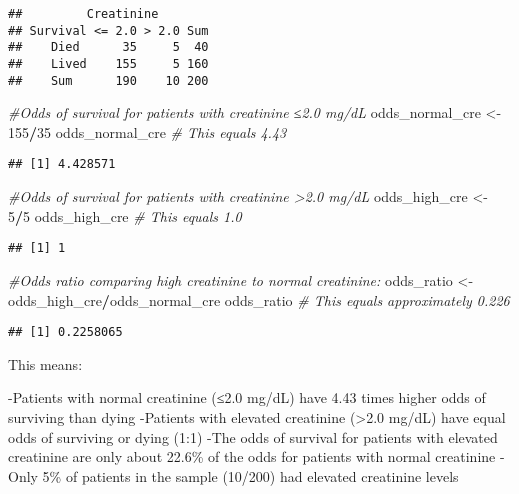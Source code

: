 \documentclass[
]{article}
\newenvironment{Shaded}{\begin{snugshade}}{\end{snugshade}}
\newcommand{\CommentTok}[1]{\textcolor[rgb]{0.56,0.35,0.01}{\textit{#1}}}
\newcommand{\DecValTok}[1]{\textcolor[rgb]{0.00,0.00,0.81}{#1}}
\newcommand{\NormalTok}[1]{#1}
\newcommand{\OtherTok}[1]{\textcolor[rgb]{0.56,0.35,0.01}{#1}}
\newcommand{\SpecialCharTok}[1]{\textcolor[rgb]{0.81,0.36,0.00}{\textbf{#1}}}
\begin{document}
\begin{verbatim}
##         Creatinine
## Survival <= 2.0 > 2.0 Sum
##    Died      35     5  40
##    Lived    155     5 160
##    Sum      190    10 200
\end{verbatim}

\begin{Shaded}
\begin{Highlighting}[]
\CommentTok{\#Odds of survival for patients with creatinine ≤2.0 mg/dL}
\NormalTok{odds\_normal\_cre }\OtherTok{\textless{}{-}} \DecValTok{155}\SpecialCharTok{/}\DecValTok{35}
\NormalTok{odds\_normal\_cre  }\CommentTok{\# This equals 4.43}
\end{Highlighting}
\end{Shaded}

\begin{verbatim}
## [1] 4.428571
\end{verbatim}

\begin{Shaded}
\begin{Highlighting}[]
\CommentTok{\#Odds of survival for patients with creatinine \textgreater{}2.0 mg/dL}
\NormalTok{odds\_high\_cre }\OtherTok{\textless{}{-}} \DecValTok{5}\SpecialCharTok{/}\DecValTok{5}
\NormalTok{odds\_high\_cre  }\CommentTok{\# This equals 1.0}
\end{Highlighting}
\end{Shaded}

\begin{verbatim}
## [1] 1
\end{verbatim}

\begin{Shaded}
\begin{Highlighting}[]
\CommentTok{\#Odds ratio comparing high creatinine to normal creatinine:}
\NormalTok{odds\_ratio }\OtherTok{\textless{}{-}}\NormalTok{ odds\_high\_cre}\SpecialCharTok{/}\NormalTok{odds\_normal\_cre}
\NormalTok{odds\_ratio  }\CommentTok{\# This equals approximately 0.226}
\end{Highlighting}
\end{Shaded}

\begin{verbatim}
## [1] 0.2258065
\end{verbatim}

This means:

-Patients with normal creatinine (≤2.0 mg/dL) have 4.43 times higher
odds of surviving than dying -Patients with elevated creatinine
(\textgreater2.0 mg/dL) have equal odds of surviving or dying (1:1) -The
odds of survival for patients with elevated creatinine are only about
22.6\% of the odds for patients with normal creatinine -Only 5\% of
patients in the sample (10/200) had elevated creatinine levels
\end{document}
